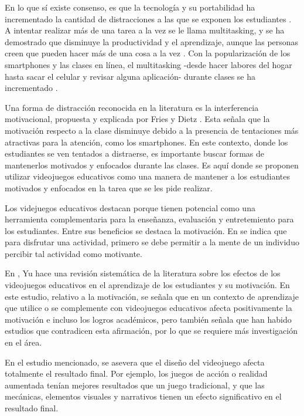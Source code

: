 En lo que sí existe consenso, es que la tecnología y su portabilidad ha incrementado la cantidad de distracciones a las que se exponen
los estudiantes \cite{Zimmerman2011HandbookOS, Wang2022ComprehensivelySummarizeDistractions}. A intentar realizar más de una tarea a la vez se le llama multitasking, y se ha demostrado que disminuye la productividad y el aprendizaje, aunque las personas creen que pueden hacer más de una cosa a la vez \cite{Domoff2019AddictivePU}.  Con la popularización de los smartphones y las clases en línea, el multitasking -desde hacer labores del hogar hasta sacar el celular y revisar alguna aplicación- durante clases se ha incrementado \cite{Wang2022ComprehensivelySummarizeDistractions}.

Una forma de distracción reconocida en la literatura es la interferencia motivacional, propuesta y explicada por Fries y Dietz \cite{Fries2007LearningMotivationalInterference}. Esta señala que la motivación respecto a la clase disminuye debido a la presencia de tentaciones más atractivas para la atención, como los smartphones. En este contexto, donde los estudiantes se ven tentados a distraerse, es importante buscar formas de mantenerlos motivados y enfocados durante las clases. Es aquí donde se proponen utilizar videojuegos educativos como una manera de mantener a los estudiantes motivados y enfocados en la tarea que se les pide realizar.

Los videjuegos educativos destacan porque tienen potencial como una herramienta complementaria para la enseñanza, evaluación y entretemiento para los estudiantes. Entre sus beneficios se destaca la motivación. En \cite{Bisson1996FunInLEarningPedagogicalRole} se indica que para disfrutar una actividad, primero se debe permitir a la mente de un individuo percibir tal actividad como motivante. 

En \cite{Yu2020TheEffectsOfEducationGames}, Yu hace una revisión sistemática de la literatura sobre los efectos de los videojuegos educativos en el aprendizaje de los estudiantes y su motivación. En este estudio, relativo a la motivación, se señala que en un contexto de aprendizaje que utilice o se complemente con videojuegos educativos afecta positivamente la motivación e incluso los logros académicos, pero también señala que han habido estudios que contradicen esta afirmación, por lo que se requiere más investigación en el área. 

En el estudio mencionado, se asevera que el diseño del videojuego afecta totalmente el resultado final. Por ejemplo, los juegos de acción o realidad aumentada tenían mejores resultados que un juego tradicional, y que las mecánicas, elementos visuales y narrativos tienen un efecto significativo en el resultado final.

